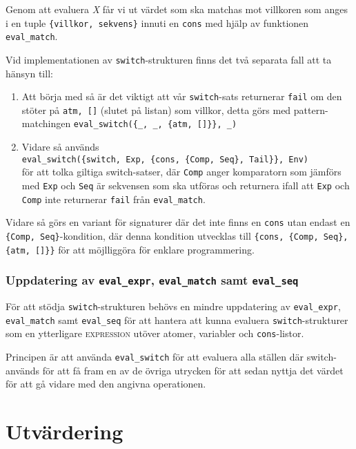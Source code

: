 \documentclass[a4paper, 11pt]{article}
\begin{document}
Genom att evaluera \textit{X} får vi ut värdet som ska matchas mot villkoren som anges i en tuple \lstinline${villkor, sekvens}$ innuti en \texttt{cons} med hjälp av funktionen \texttt{eval_match}.

Vid implementationen av \texttt{switch}-strukturen finns det två separata fall att ta hänsyn till:

\begin{enumerate}
\item Att börja med så är det viktigt att vår \texttt{switch}-sats returnerar \texttt{fail} om den stöter på \texttt{atm, []} (slutet på listan) som villkor, detta görs med pattern-matchingen \lstinline$eval_switch({_, _, {atm, []}}, _)$
\item Vidare så används \\\lstinline$eval_switch({switch, Exp, {cons, {Comp, Seq}, Tail}}, Env)$\\ för att tolka giltiga switch-satser, där \texttt{Comp} anger komparatorn som jämförs med \texttt{Exp} och \texttt{Seq} är sekvensen som ska utföras och returnera ifall att \texttt{Exp} och \texttt{Comp} inte returnerar \texttt{fail} från \texttt{eval_match}.
\end{enumerate}

Vidare så görs en variant för signaturer där det inte finns en \texttt{cons} utan endast en \lstinline|{Comp, Seq}|-kondition, där denna kondition utvecklas till \lstinline|{cons, {Comp, Seq}, {atm, []}}| för att möjlliggöra för enklare programmering.

\subsubsection{Uppdatering av \texttt{eval_expr}, \texttt{eval_match} samt \texttt{eval_seq}}

För att stödja \texttt{switch}-strukturen behövs en mindre uppdatering av \texttt{eval_expr}, \texttt{eval_match} samt \texttt{eval_seq} för att hantera att kunna evaluera \texttt{switch}-strukturer som en ytterligare \textsc{expression} utöver atomer, variabler och \texttt{cons}-listor.

Principen är att använda \texttt{eval_switch} för att evaluera alla ställen där switch-används för att få fram en av de övriga utrycken för att sedan nyttja det värdet för att gå vidare med den angivna operationen.

\section{Utvärdering}
\end{document}
